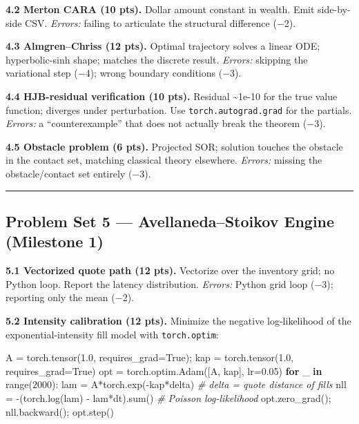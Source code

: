 \documentclass[
]{article}
\newenvironment{Shaded}{}{}
\newcommand{\BuiltInTok}[1]{\textcolor[rgb]{0.00,0.50,0.00}{#1}}
\newcommand{\CommentTok}[1]{\textcolor[rgb]{0.38,0.63,0.69}{\textit{#1}}}
\newcommand{\ControlFlowTok}[1]{\textcolor[rgb]{0.00,0.44,0.13}{\textbf{#1}}}
\newcommand{\DecValTok}[1]{\textcolor[rgb]{0.25,0.63,0.44}{#1}}
\newcommand{\FloatTok}[1]{\textcolor[rgb]{0.25,0.63,0.44}{#1}}
\newcommand{\KeywordTok}[1]{\textcolor[rgb]{0.00,0.44,0.13}{\textbf{#1}}}
\newcommand{\NormalTok}[1]{#1}
\newcommand{\OperatorTok}[1]{\textcolor[rgb]{0.40,0.40,0.40}{#1}}
\newcommand{\VariableTok}[1]{\textcolor[rgb]{0.10,0.09,0.49}{#1}}
\begin{document}
\textbf{4.2 Merton CARA (10 pts).} Dollar amount constant in wealth.
Emit side-by-side CSV. \emph{Errors:} failing to articulate the
structural difference (−2).

\textbf{4.3 Almgren--Chriss (12 pts).} Optimal trajectory solves a
linear ODE; hyperbolic-sinh shape; matches the discrete result.
\emph{Errors:} skipping the variational step (−4); wrong boundary
conditions (−3).

\textbf{4.4 HJB-residual verification (10 pts).} Residual
\textasciitilde1e-10 for the true value function; diverges under
perturbation. Use \texttt{torch.autograd.grad} for the partials.
\emph{Errors:} a ``counterexample'' that does not actually break the
theorem (−3).

\textbf{4.5 Obstacle problem (6 pts).} Projected SOR; solution touches
the obstacle in the contact set, matching classical theory elsewhere.
\emph{Errors:} missing the obstacle/contact set entirely (−3).

\begin{center}\rule{0.5\linewidth}{0.5pt}\end{center}

\subsection{Problem Set 5 --- Avellaneda--Stoikov Engine (Milestone
1)}\label{problem-set-5-avellanedastoikov-engine-milestone-1}

\textbf{5.1 Vectorized quote path (12 pts).} Vectorize over the
inventory grid; no Python loop. Report the latency distribution.
\emph{Errors:} Python grid loop (−3); reporting only the mean (−2).

\textbf{5.2 Intensity calibration (12 pts).} Minimize the negative
log-likelihood of the exponential-intensity fill model with
\texttt{torch.optim}:

\begin{Shaded}
\begin{Highlighting}[]
\NormalTok{A }\OperatorTok{=}\NormalTok{ torch.tensor(}\FloatTok{1.0}\NormalTok{, requires\_grad}\OperatorTok{=}\VariableTok{True}\NormalTok{)}\OperatorTok{;}\NormalTok{ kap }\OperatorTok{=}\NormalTok{ torch.tensor(}\FloatTok{1.0}\NormalTok{, requires\_grad}\OperatorTok{=}\VariableTok{True}\NormalTok{)}
\NormalTok{opt }\OperatorTok{=}\NormalTok{ torch.optim.Adam([A, kap], lr}\OperatorTok{=}\FloatTok{0.05}\NormalTok{)}
\ControlFlowTok{for}\NormalTok{ \_ }\KeywordTok{in} \BuiltInTok{range}\NormalTok{(}\DecValTok{2000}\NormalTok{):}
\NormalTok{    lam }\OperatorTok{=}\NormalTok{ A}\OperatorTok{*}\NormalTok{torch.exp(}\OperatorTok{{-}}\NormalTok{kap}\OperatorTok{*}\NormalTok{delta)           }\CommentTok{\# delta = quote distance of fills}
\NormalTok{    nll }\OperatorTok{=} \OperatorTok{{-}}\NormalTok{(torch.log(lam) }\OperatorTok{{-}}\NormalTok{ lam}\OperatorTok{*}\NormalTok{dt).}\BuiltInTok{sum}\NormalTok{()  }\CommentTok{\# Poisson log{-}likelihood}
\NormalTok{    opt.zero\_grad()}\OperatorTok{;}\NormalTok{ nll.backward()}\OperatorTok{;}\NormalTok{ opt.step()}
\end{Highlighting}
\end{Shaded}
\end{document}
